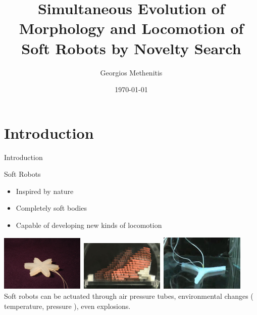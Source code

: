 \documentclass{beamer}
\title[Simultaneous Evolution of Morphology and Locomotion of Soft Robots by Novelty Search]{Simultaneous Evolution of Morphology and Locomotion of Soft Robots by Novelty Search}
\author{Georgios Methenitis}
\institute{UvA, ACT}
\date{\today}
\begin{document}
\begin{frame}
  \titlepage
\end{frame}




\section{Introduction}




\begin{frame}{Introduction}
\begin{block}{Soft Robots}
\begin{itemize}
\item Inspired by nature
\item Completely soft bodies
\item Capable of developing new kinds of locomotion
\end{itemize}
\end{block}
\includegraphics[width=0.3\textwidth,height=0.25\textheight]{figures/soft_robotics_figure.png}\		
\includegraphics[width=0.3\textwidth,height=0.25\textheight]{figures/hillerPressureChamber.png}\	
\includegraphics[width=0.3\textwidth,height=0.25\textheight]{figures/ExplodingRobot.jpg}\\
\vspace{0.3cm}
Soft robots can be actuated through air pressure tubes, environmental changes ( temperature, pressure ), even explosions.
\end{frame}
\end{document}
